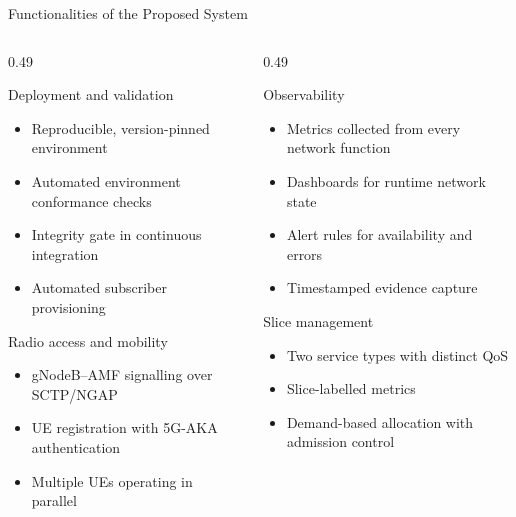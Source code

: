 \documentclass[aspectratio=169,11pt]{beamer}
\begin{document}
\begin{frame}{Functionalities of the Proposed System}
  \begin{columns}[T,onlytextwidth]
    \begin{column}{0.49\textwidth}
      \begin{block}{Deployment and validation}
        \small
        \begin{itemize}
          \item Reproducible, version-pinned environment
          \item Automated environment conformance checks
          \item Integrity gate in continuous integration
          \item Automated subscriber provisioning
        \end{itemize}
      \end{block}
      \begin{block}{Radio access and mobility}
        \small
        \begin{itemize}
          \item gNodeB--AMF signalling over SCTP/NGAP
          \item UE registration with 5G-AKA authentication
          \item Multiple UEs operating in parallel
        \end{itemize}
      \end{block}
    \end{column}
    \begin{column}{0.49\textwidth}
      \begin{block}{Observability}
        \small
        \begin{itemize}
          \item Metrics collected from every network function
          \item Dashboards for runtime network state
          \item Alert rules for availability and errors
          \item Timestamped evidence capture
        \end{itemize}
      \end{block}
      \begin{block}{Slice management}
        \small
        \begin{itemize}
          \item Two service types with distinct QoS
          \item Slice-labelled metrics
          \item Demand-based allocation with admission control
        \end{itemize}
      \end{block}
    \end{column}
  \end{columns}
\end{frame}
\end{document}
